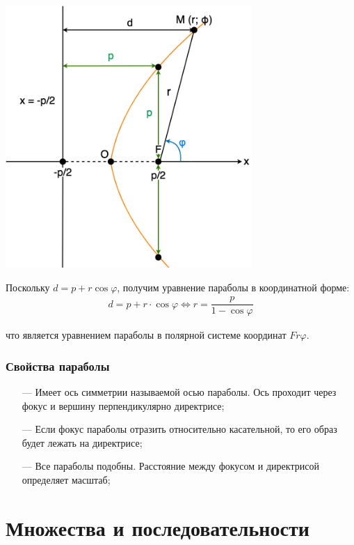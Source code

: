 \documentclass[a4paper,12pt,oneside]{extbook}
\theoremstyle{numbered}
\theoremstyle{unnumbered}
\theoremstyle{named}
\theoremstyle{unnumbered}
\theoremstyle{named}
\theoremstyle{named}
\theoremstyle{named}
\begin{document}
\begin{center}
    \includegraphics[width=0.7\textwidth]{parabola2.png}
\end{center}

Поскольку \(d = p + r\cos{\varphi}\), получим уравнение параболы в координатной форме:
\begin{gather*}
    d = p + r \cdot \cos{\varphi}  \iff r = \dfrac{p}{1 - \cos{\varphi}}
\end{gather*}

что является уравнением параболы в полярной системе координат \(Fr\varphi\).

\subsection{Свойства параболы}

\begin{itemize}
    \item[—]{Имеет ось симметрии называемой осью параболы. Ось проходит через фокус и вершину перпендикулярно директрисе;}
    \item[—]{Если фокус параболы отразить относительно касательной, то его образ будет лежать на директрисе;}
    \item[—]{Все параболы подобны. Расстояние между фокусом и директрисой определяет масштаб;}
\end{itemize}

\chapter{Множества и последовательности}%
\label{cha:Множества и последовательности}
\end{document}
